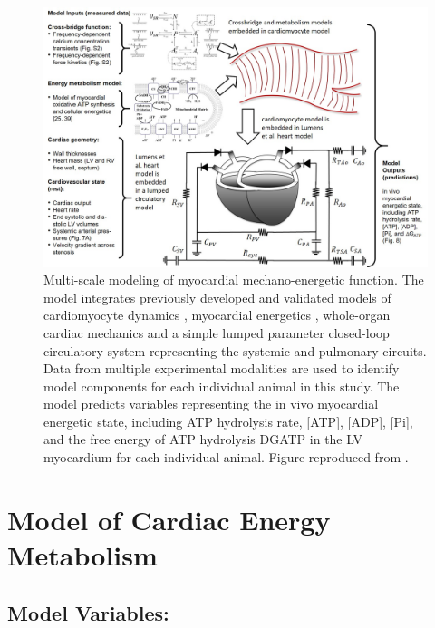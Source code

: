 \documentclass[fleqn,10pt]{physiome}
\begin{document}
\begin{figure}[ht]\centering
\includegraphics[width=1.0\linewidth]{Figure1}
\caption{Multi-scale modeling of myocardial mechano-energetic function. The model integrates previously developed and validated models of cardiomyocyte dynamics \citep{Tewari2016a,Tewari2016b}, myocardial energetics \citep{Bazil2016, Gao2019}, whole-organ cardiac mechanics \citep{Lumens2009} and a simple lumped parameter closed-loop circulatory system representing the systemic and pulmonary circuits. Data from multiple experimental modalities are used to identify model components for each individual animal in this study. The model predicts variables representing the in vivo myocardial energetic state, including ATP hydrolysis rate, [ATP], [ADP], [Pi], and the free energy of ATP hydrolysis DGATP in the LV myocardium for each individual animal. Figure reproduced from \cite{Lopez2020}.}
\label{fig:overview}
\end{figure}

\section{Model of Cardiac Energy Metabolism}

\subsection{Model Variables:}
\end{document}
